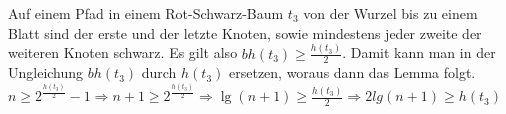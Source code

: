 \documentclass[a4paper,12pt]{article}
\begin{document}
\noindent Auf einem Pfad in einem Rot-Schwarz-Baum $t_3$ von der Wurzel bis zu einem Blatt sind der erste und der letzte Knoten, sowie mindestens jeder zweite der weiteren Knoten schwarz. Es gilt also $\mathit{bh(t_3)} \geq \frac{h(t_3)}{2}$. 
Damit kann man in der Ungleichung $\mathit{bh(t_3)}$ durch $\mathit{h(t_3)}$ ersetzen, woraus dann das Lemma folgt.\\
$n \geq 2^{\frac{\mathit{h(t_3)}}{2}} - 1 \Rightarrow n + 1 \geq 2^{\frac{\mathit{h(t_3)}}{2}} \Rightarrow
\lg(n + 1) \geq \frac{h(t_3)}{2} \Rightarrow 2 lg(n + 1) \geq h(t_3) $ 



\newpage


\end{document}
